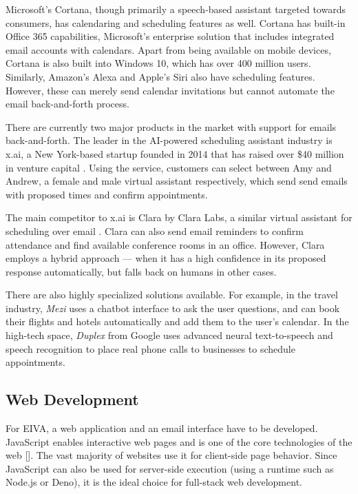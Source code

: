 \documentclass{article}
\begin{document}
 Microsoft's Cortana, though primarily a speech-based assistant targeted towards consumers, has calendaring and scheduling features as well. Cortana has built-in Office 365 capabilities, Microsoft's enterprise solution that includes integrated email accounts with calendars. Apart from being available on mobile devices, Cortana is also built into Windows 10, which has over 400 million users. Similarly, Amazon's Alexa and Apple's Siri also have scheduling features. However, these can merely send calendar invitations but cannot automate the email back-and-forth process.
 
 There are currently two major products in the market with support for emails back-and-forth. The leader in the AI-powered scheduling assistant industry is x.ai, a New York-based startup founded in 2014 that has raised over \$40 million in venture capital \cite{noauthor_x.ais_2018}. Using the service, customers can select between Amy and Andrew, a female and male virtual assistant respectively, which send send emails with proposed times and confirm appointments.
 
The main competitor to x.ai is Clara by Clara Labs, a similar virtual assistant for scheduling over email \cite{noauthor_clara_nodate}. Clara can also send email reminders to confirm attendance and find available conference rooms in an office. However, Clara employs a hybrid approach --- when it has a high confidence in its proposed response automatically, but falls back on humans in other cases.

There are also highly specialized solutions available. For example, in the travel industry, \emph{Mezi} uses a chatbot interface to ask the user questions, and can book their flights and hotels automatically and add them to the user's calendar. In the high-tech space, \emph{Duplex} from Google uses advanced neural text-to-speech and speech recognition to place real phone calls to businesses to schedule appointments.

\subsection{Web Development}

For EIVA, a web application and an email interface have to be developed. JavaScript enables interactive web pages and is one of the core technologies of the web []. The vast majority of websites use it for client-side page behavior. Since JavaScript can also be used for server-side execution (using a runtime such as Node.js or Deno), it is the ideal choice for full-stack web development.
\end{document}

